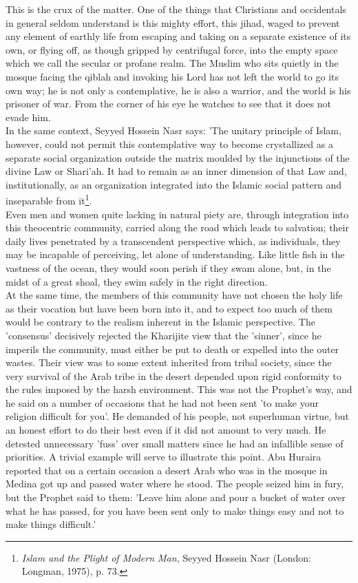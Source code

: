 \documentclass[11pt, b5paper, twoside]{book}
\begin{document}
This is the crux of the matter. One of the things that Christians and occidentals in general seldom 
understand is this mighty effort, this jihad, waged to prevent any element of earthly life from 
escaping and taking on a separate existence of its own, or flying off, as though gripped by 
centrifugal force, into the empty space which we call the secular or profane realm. The Muslim who 
sits quietly in the mosque facing the qiblah and invoking his Lord has not left the world to go its 
own way; he is not only a contemplative, he is also a warrior, and the world is his prisoner of war. 
From the corner of his eye he watches to see that it does not evade him. \\

In the same context, Seyyed Hossein Nasr says: 'The unitary principle of Islam, however, could not 
permit this contemplative way to become crystallized as a separate social organization outside the 
matrix moulded by the injunctions of the divine Law or Shari'ah. It had to remain as an inner 
dimension of that Law and, institutionally, as an organization integrated into the Islamic social 
pattern and inseparable from it\footnote{\emph{Islam and the Plight of Modern Man}, Seyyed Hossein Nasr (London: Longman, 1975), p. 73.}.\\

Even men and women quite lacking in natural piety are, through integration into this theocentric 
community, carried along the road which leads to salvation; their daily lives penetrated by a 
transcendent perspective which, as individuals, they may be incapable of perceiving, let alone of 
understanding. Like little fish in the vastness of the ocean, they would soon perish if they swam 
alone, but, in the midst of a great shoal, they swim safely in the right direction. \\

At the same time, the members of this community have not chosen the holy life as their vocation but 
have been born into it, and to expect too much of them would be contrary to the realism inherent in 
the Islamic perspective. The 'consensus' decisively rejected the Kharijite view that the 'sinner', 
since he imperils the community, must either be put to death or expelled into the outer wastes. Their 
view was to some extent inherited from tribal society, since the very survival of the Arab tribe in 
the desert depended upon rigid conformity to the rules imposed by the harsh environment. This was not 
the Prophet's way, and he said on a number of occasions that he had not been sent 'to make your 
religion difficult for you'. He demanded of his people, not superhuman virtue, but an honest effort 
to do their best even if it did not amount to very much. He detested unnecessary 'fuss' over small 
matters since he had an infallible sense of priorities. A trivial example will serve to illustrate 
this point. Abu Huraira reported that on a certain occasion a desert Arab who was in the mosque in 
Medina got up and passed water where he stood. The people seized him in fury, but the Prophet said to 
them: 'Leave him alone and pour a bucket of water over what he has passed, for you have been sent 
only to make things easy and not to make things difficult.' \\
\end{document}
